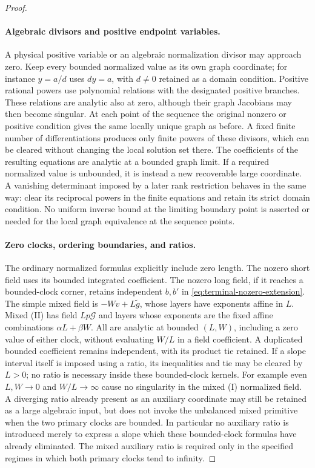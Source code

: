 \begin{proof}
\paragraph{Algebraic divisors and positive endpoint variables.}
A physical positive variable or an algebraic normalization divisor may
approach zero.  Keep every bounded normalized value as its own graph
coordinate; for instance \(y=a/d\) uses \(dy=a\), with \(d\ne0\)
retained as a domain condition.  Positive rational powers use polynomial
relations with the designated positive branches.  These relations are
analytic also at zero, although their graph Jacobians may then become
singular.  At each point of the sequence the original nonzero or positive
condition gives the same locally unique graph as before.  A fixed finite
number of differentiations produces only finite powers of these divisors,
which can be cleared without changing the local solution set there.
The coefficients of the resulting equations are analytic at a bounded
graph limit.  If a required normalized value is unbounded, it is instead
a new recoverable large coordinate.  A vanishing determinant imposed by
a later rank restriction behaves in the same way: clear its reciprocal
powers in the finite equations and retain its strict domain condition.
No uniform inverse bound at the limiting boundary point is asserted or
needed for the local graph equivalence at the sequence points.

\paragraph{Zero clocks, ordering boundaries, and ratios.}
The ordinary normalized formulas explicitly include zero length.  The
nozero short field uses its bounded integrated coefficient.  The nozero
long field, if it reaches a bounded-clock corner, retains independent
\(b,b'\) in \eqref{eq:terminal-nozero-extension}.  The simple mixed
field is \(-Wv+L\widetilde g\), whose layers have exponents affine in
\(L\).  Mixed (II) has field \(Lp\mathcal G\) and layers whose
exponents are the fixed affine combinations \(\alpha L+\beta W\).
All are analytic at bounded \((L,W)\), including a zero value of either
clock, without evaluating \(W/L\) in a field coefficient.  A duplicated
bounded coefficient remains independent, with its product tie retained.
If a slope interval itself is imposed using a ratio, its inequalities
and tie may be cleared by \(L>0\); no ratio is necessary inside these
bounded-clock kernels.  For example even \(L,W\to0\) and
\(W/L\to\infty\) cause no singularity in the mixed (I) normalized
field.  A diverging ratio already present as an auxiliary coordinate may
still be retained as a large algebraic input, but does not invoke the
unbalanced mixed primitive when the two primary clocks are bounded.
In particular no auxiliary ratio is introduced merely to express a slope
which these bounded-clock formulas have already eliminated.  The mixed
auxiliary ratio is required only in the specified regimes in which both
primary clocks tend to infinity.


\end{proof}

